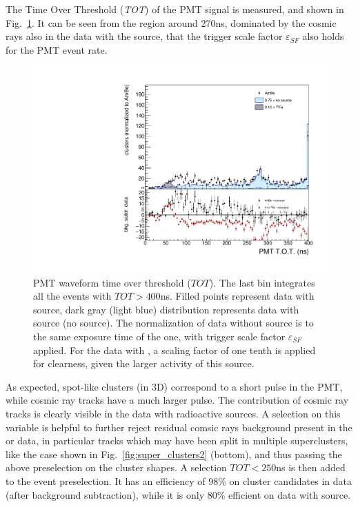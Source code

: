 %
The Time Over Threshold (\textit{TOT}) of the PMT signal is measured,
and shown in Fig.~\ref{fig:pmttot}. It can be seen from the region
around 270\unit{ns}, dominated by the cosmic rays also in the data
with the \ambe source, that the trigger scale factor
$\varepsilon_{SF}$ also holds for the PMT event rate.
%
\begin{figure}[ht]
  \begin{center}
  \includegraphics[width=0.45\linewidth]{figures/pmt_tot}

   \caption{PMT waveform time over threshold ($TOT$).  The last bin
    integrates all the events with $TOT>400$\unit{ns}. Filled points
    represent data with \ambe source, dark gray (light blue)
    distribution represents data with \fe source (no source).  The
    normalization of data without source is to the same exposure time
    of the \ambe one, with trigger scale factor $\varepsilon_{SF}$
    applied. For the data with \fe, a scaling factor of one tenth is
    applied for clearness, given the larger activity of this
    source. \label{fig:pmttot}}

  \end{center}
\end{figure}
%
As expected, spot-like clusters (in 3D) correspond to a short pulse in
the PMT, while cosmic ray tracks have a much larger pulse. The
contribution of cosmic ray tracks is clearly visible in the data with
radioactive sources. A selection on this variable is helpful to
further reject residual comsic rays background present in the \ambe or
\fe data, in particular tracks which may have been split in multiple
superclusters, like the case shown in Fig.~\ref{fig:super_clusters2}
(bottom), and thus passing the above preselection on the cluster
shapes. A selection $TOT<250$\unit{ns} is then added to the event
preselection.  It has an efficiency of 98\% on cluster candidates in
\ambe data (after background subtraction), while it is only 80\%
efficient on data with \fe source.


